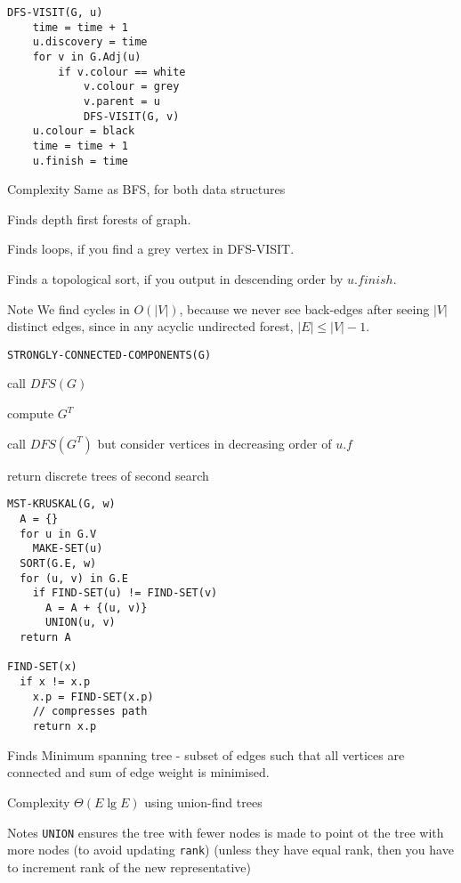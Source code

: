 \documentclass[10pt, a4paper,landscape]{article}
\begin{document}
\begin{multicols*}{4}
\begin{lstlisting}
DFS-VISIT(G, u)
    time = time + 1
    u.discovery = time
    for v in G.Adj(u)
        if v.colour == white
            v.colour = grey
            v.parent = u
            DFS-VISIT(G, v)
    u.colour = black
    time = time + 1
    u.finish = time
\end{lstlisting}
\begin{compactitem}
    \item[Complexity] Same as BFS, for both data structures
    \item[Finds] depth first forests of graph.
    \item[Finds] loops, if you find a grey vertex in DFS-VISIT.
    \item[Finds] a topological sort, if you output in descending order by $u.finish$.
    \item[Note] We find cycles in $O(|V|)$, because we never see back-edges after seeing $|V|$ distinct edges, since in any acyclic undirected forest, $|E| \leq |V| - 1$. 
\end{compactitem}

\begin{lstlisting}
STRONGLY-CONNECTED-COMPONENTS(G)
\end{lstlisting}
\begin{compactitem}
    \item call $DFS(G)$
    \item compute $G^T$
    \item call $DFS(G^T)$ but consider vertices in
        decreasing order of $u.f$
    \item return discrete trees of second search
\end{compactitem}

\begin{lstlisting}
MST-KRUSKAL(G, w)
  A = {}
  for u in G.V
    MAKE-SET(u)
  SORT(G.E, w)
  for (u, v) in G.E
    if FIND-SET(u) != FIND-SET(v)
      A = A + {(u, v)}
      UNION(u, v)
  return A

FIND-SET(x)
  if x != x.p
    x.p = FIND-SET(x.p) 
    // compresses path
    return x.p
\end{lstlisting}
\begin{compactitem}
    \item[Finds] Minimum spanning tree - subset of edges such that all vertices are connected and sum of edge weight is minimised.
    \item[Complexity] $\Theta(E\lg{E})$ using union-find trees
    \item[Notes] \texttt{UNION} ensures the tree with fewer nodes is made to point ot the tree with more nodes (to avoid updating \texttt{rank}) (unless they have equal rank, then you have to increment rank of the new representative)
\end{compactitem}


\end{multicols*}
\end{document}
